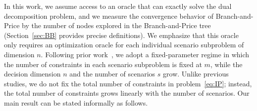 \documentclass{article}
\begin{document}


In this work, we assume access to an oracle that can exactly solve the
dual decomposition problem, and we measure the convergence behavior of
Branch-and-Price by the number of nodes explored in the Branch-and-Price tree
(Section~\ref{sec:BB} provides precise definitions). We emphasize that this
oracle only requires an optimization oracle for each individual scenario
subproblem of dimension $n$.
Following prior work~\cite{dyer1989probabilistic,borst2023integrality,dey2021branch},
we adopt a fixed-parameter regime in which the number of constraints in each
scenario subproblem is fixed at $m$, while the decision dimension $n$ and the
number of scenarios $s$ grow. 
Unlike previous studies, we do not fix the total number of constraints in
problem~\eqref{eq:IP}; instead, the total number of constraints grows linearly
with the number of scenarios.
Our main result can be stated informally as follows.
\end{document}

